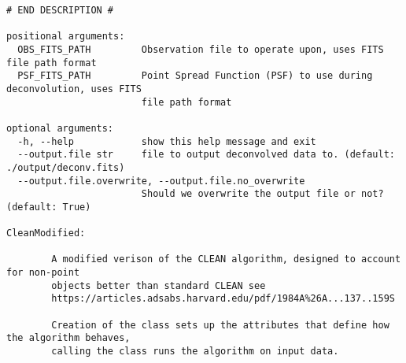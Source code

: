 \begin{verbatim}
# END DESCRIPTION #

positional arguments:
  OBS_FITS_PATH         Observation file to operate upon, uses FITS file path format
  PSF_FITS_PATH         Point Spread Function (PSF) to use during deconvolution, uses FITS
                        file path format

optional arguments:
  -h, --help            show this help message and exit
  --output.file str     file to output deconvolved data to. (default: ./output/deconv.fits)
  --output.file.overwrite, --output.file.no_overwrite
                        Should we overwrite the output file or not? (default: True)

CleanModified:
  
        A modified verison of the CLEAN algorithm, designed to account for non-point 
        objects better than standard CLEAN see 
        https://articles.adsabs.harvard.edu/pdf/1984A%26A...137..159S
  
        Creation of the class sets up the attributes that define how the algorithm behaves,
        calling the class runs the algorithm on input data.
  


\end{verbatim}
